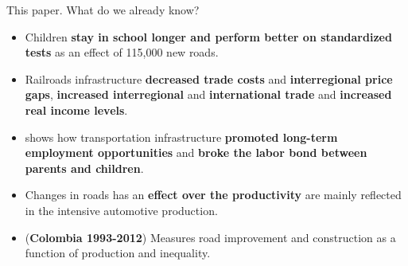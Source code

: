 \documentclass[9pt]{beamer}
\begin{document}
\begin{frame}{This paper. \hyperlink{contribution}{}}
\label{rev.literature}
\justifying 
What do we already know?
    \begin{itemize}
      
            \item   \cite{Adukia2020} Children \textbf{stay in school longer and perform better on standardized tests} as an effect of 115,000 new roads.
            \item    \cite{Donaldson2010} Railroads infrastructure  \textbf{decreased trade costs} and \textbf{interregional price gaps}, \textbf{increased interregional} and \textbf{international trade} and \textbf{increased real income levels}.
            \item  \cite{Fernandez2020} shows how transportation infrastructure \textbf{promoted long-term employment opportunities} and \textbf{broke the labor bond between parents and children}.
            \item   \cite{Fernald1999} Changes in roads has an \textbf{effect over the productivity} are mainly reflected in the intensive automotive production.
            \item   \cite{Sinisterra} (\textbf{Colombia 1993-2012})  Measures road improvement and construction as a function of production and inequality.
       
    \end{itemize}

    
\end{frame}
\end{document}
